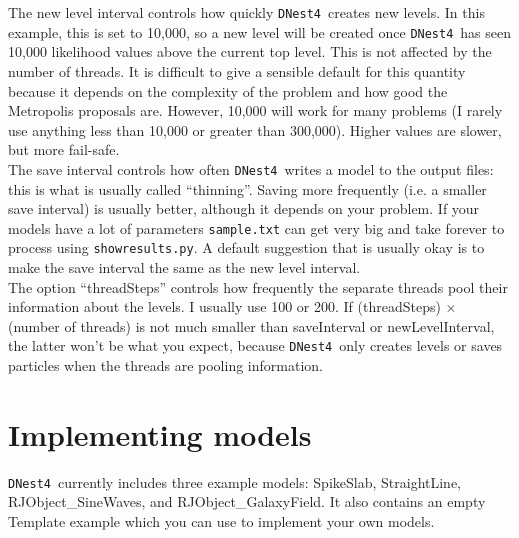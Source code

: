 \documentclass[a4paper, 11pt]{article}
\newcommand{\dnest}{{\tt DNest4}}
\begin{document}
The new level interval controls how quickly \dnest~creates new levels. In this
example, this is set to 10,000, so a new level will be created once \dnest~has
seen 10,000 likelihood values above the current top level. This is not affected by
the number of threads. It is difficult to give a sensible default for this
quantity because it depends on the complexity of the problem and how good
the Metropolis proposals are. However, 10,000
will work for many problems (I rarely use anything less than 10,000 or greater
than 300,000). Higher values are slower, but more fail-safe.\\

The save interval controls how often \dnest~writes a model to the output
files: this is what is usually called ``thinning''. Saving more frequently
(i.e. a smaller save interval) is usually better, although it depends on your
problem. If your models have a lot of parameters {\tt sample.txt} can get
very big and take forever to process using {\tt showresults.py}. A default
suggestion that is usually okay is to make the save interval the same as the
new level interval.\\

The option ``threadSteps'' controls how frequently the separate threads pool
their information about the levels. I usually use 100 or 200. If
(threadSteps) $\times$ (number of threads) is not much smaller than
saveInterval or newLevelInterval, the latter won't be what you expect, because
\dnest~only creates levels or saves particles when the threads are pooling
information.\\

\section{Implementing models}
\dnest~currently includes three example models: SpikeSlab, StraightLine,
RJObject\_SineWaves, and RJObject\_GalaxyField.
It also contains an empty Template example which you can use
to implement your own models.\\
\end{document}
